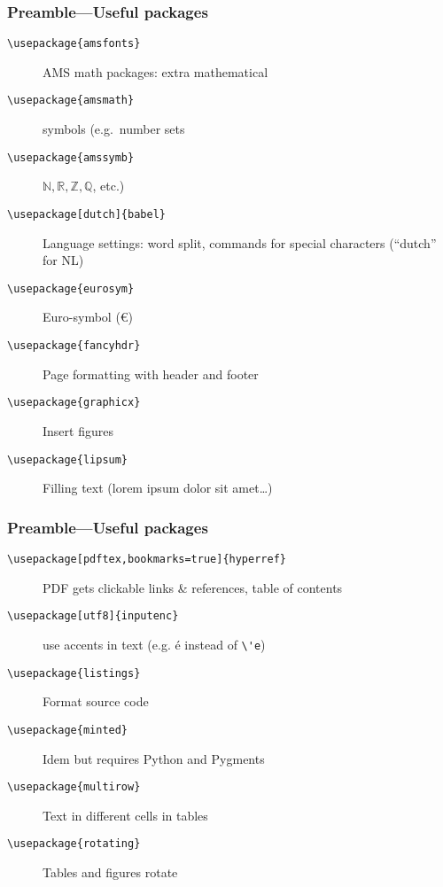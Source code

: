 \documentclass[aspectratio=169]{beamer}
\begin{document}
\begin{frame}[fragile]
  \frametitle{Preamble---Useful packages}

  \begin{description}
    \item[\texttt{\textbackslash{}usepackage\{amsfonts\}}] AMS math packages: extra mathematical
    \item[\texttt{\textbackslash{}usepackage\{amsmath\}}] symbols (e.g.\ number sets
    \item[\texttt{\textbackslash{}usepackage\{amssymb\}}] \(\mathbb{N}, \mathbb{R}, \mathbb{Z}, \mathbb{Q}\), etc.)
    \pause
    \item[\texttt{\textbackslash{}usepackage[dutch]\{babel\}}] Language settings: word split, commands for special characters (``dutch'' for NL)
    \pause
    \item[\texttt{\textbackslash{}usepackage\{eurosym\}}] Euro-symbol (\euro)
    \pause
    \item[\texttt{\textbackslash{}usepackage\{fancyhdr\}}] Page formatting with header and footer
    \pause
    \item[\texttt{\textbackslash{}usepackage\{graphicx\}}] Insert figures
    \item[\texttt{\textbackslash{}usepackage\{lipsum\}}] Filling text (lorem ipsum dolor sit amet\ldots)
  \end{description}
\end{frame}

\begin{frame}[fragile]
  \frametitle{Preamble---Useful packages}

  \begin{description}
    \item[\texttt{\textbackslash{}usepackage[pdftex,bookmarks=true]\{hyperref\}}] PDF gets clickable links \& references, table of contents \pause
    \item[\texttt{\textbackslash{}usepackage[utf8]\{inputenc\}}] use accents in text (e.g. é instead of \verb|\'e|) \pause
    \item[\texttt{\textbackslash{}usepackage\{listings\}}] Format source code \pause
    \item[\texttt{\textbackslash{}usepackage\{minted\}}] Idem but requires Python and Pygments \pause
    \item[\texttt{\textbackslash{}usepackage\{multirow\}}] Text in different cells in tables \pause
    \item[\texttt{\textbackslash{}usepackage\{rotating\}}] Tables and figures rotate \pause
  \end{description}
\end{frame}
\end{document}
